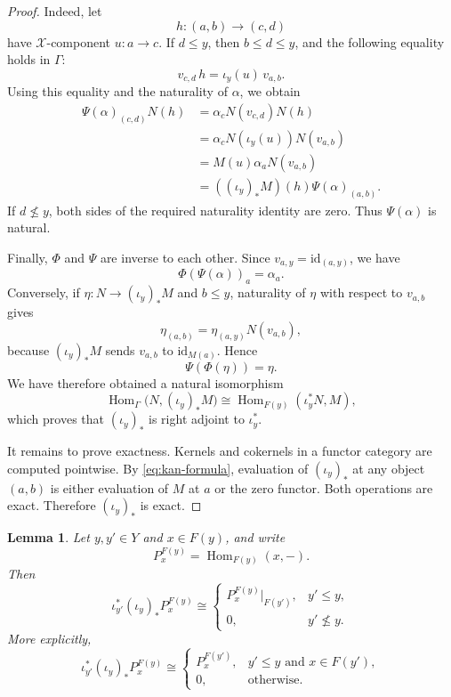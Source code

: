 \documentclass[12pt,a4paper,english,reqno]{amsart}
\theoremstyle{plain}
\newtheorem{lemma}[theorem]{Lemma}
\theoremstyle{definition}
\newcommand{\Hom}{\operatorname{Hom}}
\newcommand{\id}{\mathrm{id}}
\newcommand{\X}{\mathcal X}
\newcommand{\G}{\Gamma}
\begin{document}
\begin{proof}
Indeed, let
\[
h:(a,b)\longrightarrow(c,d)
\]
have $\X$-component $u:a\to c$. If $d\leq y$, then
$b\leq d\leq y$, and the following equality holds in $\G$:
\[
v_{c,d}\,h
=
\iota_y(u)\,v_{a,b}.
\]
Using this equality and the naturality of $\alpha$, we obtain
\[
\begin{split}
\Psi(\alpha)_{(c,d)}N(h)
&=
\alpha_cN(v_{c,d})N(h)\\
&=
\alpha_cN(\iota_y(u))N(v_{a,b})\\
&=
M(u)\alpha_aN(v_{a,b})\\
&=
((\iota_y)_*M)(h)\Psi(\alpha)_{(a,b)}.
\end{split}
\]
If $d\nleq y$, both sides of the required naturality identity are zero.
Thus $\Psi(\alpha)$ is natural.

Finally, $\Phi$ and $\Psi$ are inverse to each other. Since
$v_{a,y}=\id_{(a,y)}$, we have
\[
\Phi(\Psi(\alpha))_a=\alpha_a.
\]
Conversely, if $\eta:N\to(\iota_y)_*M$ and $b\leq y$, naturality of
$\eta$ with respect to $v_{a,b}$ gives
\[
\eta_{(a,b)}
=
\eta_{(a,y)}N(v_{a,b}),
\]
because $(\iota_y)_*M$ sends $v_{a,b}$ to $\id_{M(a)}$. Hence
\[
\Psi(\Phi(\eta))=\eta.
\]
We have therefore obtained a natural isomorphism
\[
\Hom_{\G}\bigl(N,(\iota_y)_*M\bigr)
\cong
\Hom_{F(y)}(\iota_y^*N,M),
\]
which proves that $(\iota_y)_*$ is right adjoint to $\iota_y^*$.

It remains to prove exactness. Kernels and cokernels in a functor
category are computed pointwise. By \eqref{eq:kan-formula}, evaluation
of $(\iota_y)_*$ at any object $(a,b)$ is either evaluation of $M$ at
$a$ or the zero functor. Both operations are exact. Therefore
$(\iota_y)_*$ is exact.
\end{proof}

\begin{lemma}
\label{lem:restriction-kan}
Let $y,y'\in Y$ and $x\in F(y)$, and write
\[
P_x^{F(y)}=\Hom_{F(y)}(x,-).
\]
Then
\[
\iota_{y'}^*(\iota_y)_*P_x^{F(y)}
\cong
\begin{cases}
P_x^{F(y)}\vert_{F(y')}, & y'\leq y,\\
0,                        & y'\nleq y.
\end{cases}
\]
More explicitly,
\begin{equation}
\iota_{y'}^*(\iota_y)_*P_x^{F(y)}
\cong
\begin{cases}
P_x^{F(y')},
  & y'\leq y\text{ and }x\in F(y'),\\
0,
  & \text{otherwise}.
\end{cases}
\label{eq:restriction-kan}
\end{equation}
\end{lemma}
\end{document}
